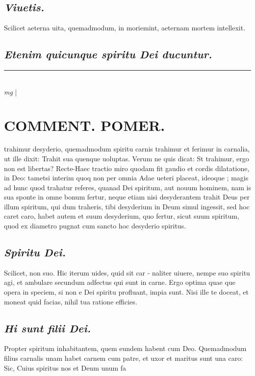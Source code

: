 \documentclass{article}
\begin{document}
\begin{pages}
\subsection*{\textit{Viuetis. }}\pstart Scilicet aeterna uita, quemadmodum, in moriemint, aeternam mortem intellexit.   \pend
{}
{}
\subsection*{\textit{Etenim quicunque spiritu Dei ducuntur. }}
\vspace{0.5cm}\noindent
\vspace{0.2cm}\rule{1cm}{0.2pt}\\ 
\hspace{0.2cm}\textit{mg}
\footnotesize 
\normalsize| 
\section*{COMMENT. POMER.  }\pstart trahimur desyderio, quemadmodum spiritu carnis trahimur et ferimur in carnalia, ut ille dixit: Trahit sua quenque uoluptas. Verum ne quis dicat: St trahimur, ergo non est libertas? Recte-Haec tractio miro quodam fit gaudio et cordis dilatatione, in Deo: tametsi interim quoq non per omnia Adae ueteri placeat, ideoque ; magis ad hunc quod trahatur referes, quanad Dei spiritum, aut nouum hominem, nam is sua sponte in omne bonum fertur, neque etiam nisi desyderantem trahit Deus per illum spiritum, qui dum traheris, tibi desyderium in Deum simul ingessit, sed hoc caret caro, habet autem et suum desyderium, quo fertur, sicut suum spiritum, quod ex diametro pugnat cum sancto hoc desyderio spiritus.   \pend
{}
{}
\subsection*{\textit{Spiritu Dei. }}\pstart Scilicet, non suo. Hic iterum uides, quid sit car - naliter uiuere, nempe suo spiritu agi, et ambulare secundum adfectus qui sunt in carne. Ergo optima quae que opera in speciem, si non e Dei spiritu profluant, impia sunt. Nisi ille te doceat, et moneat quid facias, nihil tua ratione efficies.   \pend
{}
{}
\subsection*{\textit{Hi sunt filii Dei. }}\pstart Propter spiritum inhabitantem, quem eundem habent cum Deo. Quemadmodum filius carnalis unam habet carnem cum patre, et uxor et maritus sunt una caro: Sic, Cuius spiritus nos et Deum unum fa\pend

\end{pages}
\end{document}
